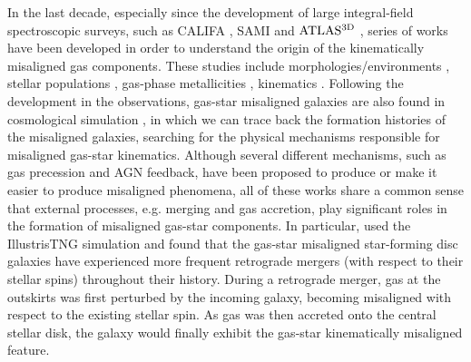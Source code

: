 In the last decade, especially since the development of large integral-field spectroscopic surveys, such as CALIFA \citep{2012A&A...538A...8S}, SAMI \citep{2012MNRAS.421..872C} and $\rm ATLAS^{3D}$ \citep{2011MNRAS.413..813C}, series of works have been developed in order to understand the origin of the kinematically misaligned gas components. These studies include morphologies/environments \citep{davis_atlas3d_2011, barrera-ballesteros_kinematic_2014, barrera-ballesteros_tracing_2015, jin_sdss-iv_2016, bassett_formation_2017, 2021MNRAS.505.5075Y}, stellar populations \citep{chen_growth_2016, jin_sdss-iv_2016, bevacqua_sdss-iv_2021}, gas-phase metallicities \citep{chen_growth_2016, jin_sdss-iv_2016}, kinematics \citep{katkov_decoupled_2014, naab_atlas3d_2014, bevacqua_sdss-iv_2021}. Following the development in the observations, gas-star misaligned galaxies are also found in cosmological simulation \citep{osman_strong_2017, bassett_formation_2017, taylor_origin_2018, duckworth_sdss-iv_2019, starkenburg_origin_2019, 2020MNRAS.492.1869D, 2020MNRAS.495.4542D, khoperskov_extreme_2020, khim_stargas_2021}, in which we can trace back the formation histories of the misaligned galaxies, searching for the physical mechanisms responsible for misaligned gas-star kinematics. Although several different mechanisms, such as gas precession and AGN feedback, have been proposed to produce or make it easier to produce misaligned phenomena, all of these works share a common sense that external processes, e.g. merging and gas accretion, play significant roles in the formation of misaligned gas-star components. In particular, \citet{lu_hot_2021} used the IllustrisTNG simulation \citep{marinacci_first_2018, naiman_first_2018, nelson_first_2018, nelson_first_2019, pillepich_first_2018, pillepich_first_2019, springel_first_2018} and found that the gas-star misaligned star-forming disc galaxies have experienced more frequent retrograde mergers (with respect to their stellar spins) throughout their history. During a retrograde merger, gas at the outskirts was first perturbed by the incoming galaxy, becoming misaligned with respect to the existing stellar spin. As gas was then accreted onto the central stellar disk, the galaxy would finally exhibit the gas-star kinematically misaligned feature.

